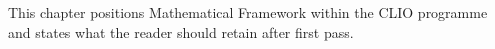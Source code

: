 This chapter positions Mathematical Framework within the CLIO programme and states what the reader should retain after first pass.
